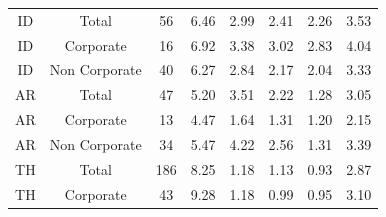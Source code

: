 {\begin{table}[ht]
{{\begin{tabular}{cccccccc}
                \midrule                                                                                                                                                                                                           
                ID & Total & 56 & 6.46 & 2.99 & 2.41 & 2.26 & 3.53\\                                                                                                                                                               
                ID & Corporate & 16 & 6.92 & 3.38 & 3.02 & 2.83 & 4.04\\                                                                                                                                                           
                ID & Non Corporate & 40 & 6.27 & 2.84 & 2.17 & 2.04 & 3.33\\                                                                                                                                                       
                \midrule                                                                                                                                                                                                           
                AR & Total & 47 & 5.20 & 3.51 & 2.22 & 1.28 & 3.05\\                                                                                                                                                               
                AR & Corporate & 13 & 4.47 & 1.64 & 1.31 & 1.20 & 2.15\\                                                                                                                                                           
                AR & Non Corporate & 34 & 5.47 & 4.22 & 2.56 & 1.31 & 3.39\\                                                                                                                                                       
                \midrule                                                                                                                                                                                                           
                TH & Total & 186 & 8.25 & 1.18 & 1.13 & 0.93 & 2.87\\                                                                                                                                                              
                TH & Corporate & 43 & 9.28 & 1.18 & 0.99 & 0.95 & 3.10\\                                                                                                                                                           

\end{tabular}}}
\end{table}}
